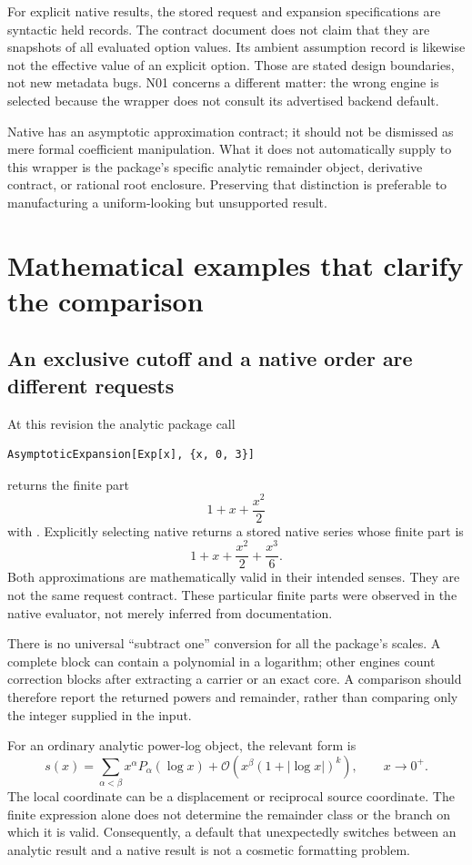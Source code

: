 \documentclass[11pt,letterpaper]{article}
\newcommand{\code}[1]{\texttt{\detokenize{#1}}}
\newcommand{\Ocal}{\mathcal{O}}
\begin{document}
For explicit native results, the stored request and expansion specifications
are syntactic held records. The contract document does not claim that they
are snapshots of all evaluated option values. Its ambient assumption record
is likewise not the effective value of an explicit \code{Assumptions} option.
Those are stated design boundaries, not new metadata bugs. N01 concerns a
different matter: the wrong engine is selected because the wrapper does not
consult its advertised backend default.

Native \code{Asymptotic} has an asymptotic approximation contract; it should
not be dismissed as mere formal coefficient manipulation. What it does not
automatically supply to this wrapper is the package's specific analytic
remainder object, derivative contract, or rational root enclosure. Preserving
that distinction is preferable to manufacturing a uniform-looking but
unsupported result.

\section{Mathematical examples that clarify the comparison}

\subsection{An exclusive cutoff and a native order are different requests}

At this revision the analytic package call
\begin{lstlisting}
AsymptoticExpansion[Exp[x], {x, 0, 3}]
\end{lstlisting}
returns the finite part
\[
  1+x+\frac{x^2}{2}
\]
with \code{PowerLogRemainder[x,3,0]}. Explicitly selecting native
\code{Series} returns a stored native series whose finite part is
\[
  1+x+\frac{x^2}{2}+\frac{x^3}{6}.
\]
Both approximations are mathematically valid in their intended senses.
They are not the same request contract. These particular finite parts were
observed in the native evaluator, not merely inferred from documentation.

There is no universal ``subtract one'' conversion for all the package's
scales. A complete block can contain a polynomial in a logarithm; other
engines count correction blocks after extracting a carrier or an exact core.
A comparison should therefore report the returned powers and remainder,
rather than comparing only the integer supplied in the input.

For an ordinary analytic power-log object, the relevant form is
\begin{equation}\label{eq:jet}
 s(x)=\sum_{\alpha<\beta} x^\alpha P_\alpha(\log x)
     +\Ocal\!\left(x^\beta(1+|\log x|)^k\right),
 \qquad x\longrightarrow0^+.
\end{equation}
The local coordinate can be a displacement or reciprocal source coordinate.
The finite expression alone does not determine the remainder class or the
branch on which it is valid. Consequently, a default that unexpectedly
switches between an analytic result and a native result is not a cosmetic
formatting problem.
\end{document}
